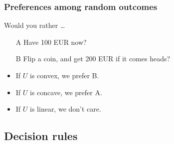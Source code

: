 \begin{frame}
  \frametitle{Preferences among random outcomes}
  \begin{example}
    Would you rather \ldots
    \begin{itemize}
    \item[A] Have 100 EUR now?
    \item[B] Flip a coin, and get 200 EUR if it comes heads?
    \end{itemize}    
  \end{example}
  \begin{itemize}
  \item<3-> If $U$ is convex, we prefer B.
  \item<4-> If $U$ is concave, we prefer A.
  \item<5-> If $U$ is linear, we don't care.
  \end{itemize}
\end{frame}




\subsection{Decision rules}

